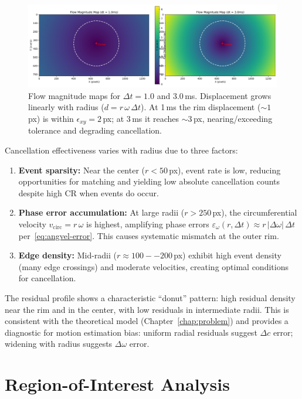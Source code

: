\begin{figure}[t]
  \centering
  \includegraphics[width=0.95\linewidth]{images/results_figures/flow_magnitude_maps.png}
\caption{Flow magnitude maps for $\Delta t=1.0$ and $3.0$\,ms. Displacement grows linearly with radius ($d=r\,\omega\,\Delta t$). At 1\,ms the rim displacement ($\sim 1$\,px) is within $\epsilon_{xy}=2$\,px; at 3\,ms it reaches $\sim 3$\,px, nearing/exceeding tolerance and degrading cancellation.}
  \label{fig:flow_magnitude}
\end{figure}

Cancellation effectiveness varies with radius due to three factors:
\begin{enumerate}
\item \textbf{Event sparsity:} Near the center ($r < 50$\,px), event rate is low, reducing opportunities for matching and yielding low absolute cancellation counts despite high CR when events do occur.
\item \textbf{Phase error accumulation:} At large radii ($r > 250$\,px), the circumferential velocity $v_{\text{circ}} = r\,\omega$ is highest, amplifying phase errors $\varepsilon_{\omega}(r,\Delta t) \approx r\,|\Delta\omega|\,\Delta t$ per~\eqref{eq:angvel-error}. This causes systematic mismatch at the outer rim.
\item \textbf{Edge density:} Mid-radii ($r \approx 100--200$\,px) exhibit high event density (many edge crossings) and moderate velocities, creating optimal conditions for cancellation.
\end{enumerate}

The residual profile shows a characteristic ``donut'' pattern: high residual density near the rim and in the center, with low residuals in intermediate radii. This is consistent with the theoretical model (Chapter~\ref{chap:problem}) and provides a diagnostic for motion estimation bias: uniform radial residuals suggest $\Delta c$ error; widening with radius suggests $\Delta\omega$ error.

\section{Region-of-Interest Analysis}

